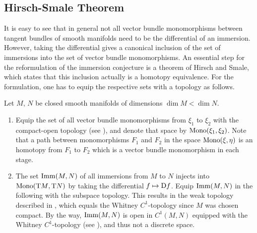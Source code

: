 \subsection{Hirsch-Smale Theorem}\label{sec:hirschsmale}
It is easy to see that in general not all vector bundle monomorphisms
between tangent bundles of smooth manifolds need to be the
differential of an immersion. However, taking the differential gives a
canonical inclusion of the set of immersions into the set of vector
bundle monomorphisms.
An essential step for the reformulation of the immersion conjecture is
a theorem of Hirsch and Smale, which states that this inclusion
actually is a homotopy equivalence.
For the formulation, one has to equip the respective sets with a
topology as follows.
\begin{Def}
  Let $M$, $N$ be closed smooth manifolds of dimensions $\dim M<\dim N$.
  \begin{enumerate}
  \item
    Equip the set of all vector bundle monomorphisms from $\xi_1$ to
    $\xi_2$ with the compact-open topology (see \forexample
    \cite{hatcher}), and denote that space by $\mathrm{Mono}({\xi_1},{\xi_2})$.
    Note that a path between monomorphisms $F_1$ and $F_2$ in the
    space $\mathrm{Mono}({\xi},{\eta})$ is an homotopy from $F_1$ to $F_2$ which is
    a vector bundle monomorphism in each stage.
  \item
    The set $\mathrm{Imm}({M},{N})$ of all immersions from $M$ to $N$ injects
    into $\mathrm{Mono}({\mathrm{T}M},{\mathrm{T}N})$ by taking the differential
    $f\mapsto\mathrm{D} f$.
    Equip $\mathrm{Imm}({M},{N})$ in the following with the subspace topology.
    This results in the weak topology described in
    \cite[Section~2.1]{hirsch}, which equals the Whitney
    $C^1$-topology since $M$ was chosen compact.
    By the way, $\mathrm{Imm}({M},{N})$ is open in $C^1(M,N)$ equipped with the
    Whitney $C^1$-topology
    (see \cite[Section~2.1, Theorem~1.1]{hirsch}),
    and thus not a discrete space.
  \end{enumerate}
\end{Def}

